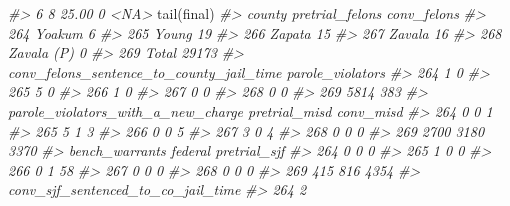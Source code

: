 \documentclass[
]{krantz}
\makeatletter
\newenvironment{Shaded}{\begin{snugshade}}{\end{snugshade}}
\newcommand{\CommentTok}[1]{\textcolor[rgb]{0.37,0.37,0.37}{\textit{#1}}}
\newcommand{\FunctionTok}[1]{\textcolor[rgb]{0,0,0}{#1}}
\newcommand{\NormalTok}[1]{#1}
\newenvironment{kframe}{%
\medskip{}
\setlength{\fboxsep}{.8em}
 \def\at@end@of@kframe{}%
 \ifinner\ifhmode%
  \def\at@end@of@kframe{\end{minipage}}%
  \begin{minipage}{\columnwidth}%
 \fi\fi%
 \def\FrameCommand##1{\hskip\@totalleftmargin \hskip-\fboxsep
 \colorbox{shadecolor}{##1}\hskip-\fboxsep
     \hskip-\linewidth \hskip-\@totalleftmargin \hskip\columnwidth}%
 \MakeFramed {\advance\hsize-\width
   \@totalleftmargin\z@ \linewidth\hsize
   \@setminipage}}%
 {\par\unskip\endMakeFramed%
 \at@end@of@kframe}
\renewenvironment{Shaded}{\begin{kframe}}{\end{kframe}}
\makeatother
\begin{document}
\begin{Shaded}
\begin{Highlighting}[]
\CommentTok{\#\textgreater{} 6              8               25.00              0  \textless{}NA\textgreater{}}
\FunctionTok{tail}\NormalTok{(final)}
\CommentTok{\#\textgreater{}         county pretrial\_felons conv\_felons}
\CommentTok{\#\textgreater{} 264     Yoakum                           6}
\CommentTok{\#\textgreater{} 265      Young                          19}
\CommentTok{\#\textgreater{} 266     Zapata                          15}
\CommentTok{\#\textgreater{} 267     Zavala                          16}
\CommentTok{\#\textgreater{} 268 Zavala (P)                           0}
\CommentTok{\#\textgreater{} 269                      Total       29173}
\CommentTok{\#\textgreater{}     conv\_felons\_sentence\_to\_county\_jail\_time parole\_violators}
\CommentTok{\#\textgreater{} 264                                        1                0}
\CommentTok{\#\textgreater{} 265                                        5                0}
\CommentTok{\#\textgreater{} 266                                        1                0}
\CommentTok{\#\textgreater{} 267                                        0                0}
\CommentTok{\#\textgreater{} 268                                        0                0}
\CommentTok{\#\textgreater{} 269                                     5814              383}
\CommentTok{\#\textgreater{}     parole\_violators\_with\_a\_new\_charge pretrial\_misd conv\_misd}
\CommentTok{\#\textgreater{} 264                                  0             0         1}
\CommentTok{\#\textgreater{} 265                                  5             1         3}
\CommentTok{\#\textgreater{} 266                                  0             0         5}
\CommentTok{\#\textgreater{} 267                                  3             0         4}
\CommentTok{\#\textgreater{} 268                                  0             0         0}
\CommentTok{\#\textgreater{} 269                               2700          3180      3370}
\CommentTok{\#\textgreater{}     bench\_warrants federal pretrial\_sjf}
\CommentTok{\#\textgreater{} 264              0       0            0}
\CommentTok{\#\textgreater{} 265              1       0            0}
\CommentTok{\#\textgreater{} 266              0       1           58}
\CommentTok{\#\textgreater{} 267              0       0            0}
\CommentTok{\#\textgreater{} 268              0       0            0}
\CommentTok{\#\textgreater{} 269            415     816         4354}
\CommentTok{\#\textgreater{}     conv\_sjf\_sentenced\_to\_co\_jail\_time}
\CommentTok{\#\textgreater{} 264                                  2}

\end{Highlighting}
\end{Shaded}
\end{document}
